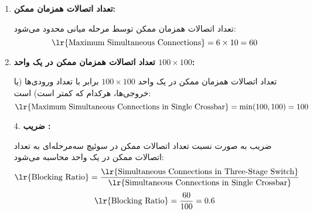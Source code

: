 \begin{qsolve}
\begin{enumerate}[label=\arabic*.]
		\item \textbf{تعداد اتصالات همزمان ممکن:}
		
		تعداد اتصالات همزمان ممکن توسط مرحله میانی محدود می‌شود:
		\[
		\text{\lr{Maximum Simultaneous Connections}} = 6 \times 10 = 60
		\]
		
		
		\item \textbf{تعداد اتصالات همزمان ممکن در یک  واحد $100 \times 100$:}
		
		تعداد اتصالات همزمان ممکن در یک  واحد \(100 \times 100\) برابر با تعداد ورودی‌ها (یا خروجی‌ها، هرکدام که کمتر است) است:
		\[
		\text{\lr{Maximum Simultaneous Connections in Single Crossbar}} = \min(100, 100) = 100
		\]
	\end{enumerate}	
\end{qsolve}
\newpage

\begin{qsolve}
	\begin{enumerate}
		\item [4.] \textbf{ضریب :}
		
		ضریب  به صورت نسبت تعداد اتصالات ممکن در سوئیچ سه‌مرحله‌ای به تعداد اتصالات ممکن در یک  واحد محاسبه می‌شود:
		\[
		\text{\lr{Blocking Ratio}} = \frac{\text{\lr{Simultaneous Connections in Three-Stage Switch}}}{\text{\lr{Simultaneous Connections in Single Crossbar}}}
		\]
		\[
		\text{\lr{Blocking Ratio}} = \frac{60}{100} = 0.6
		\]
		
	\end{enumerate}
\end{qsolve}